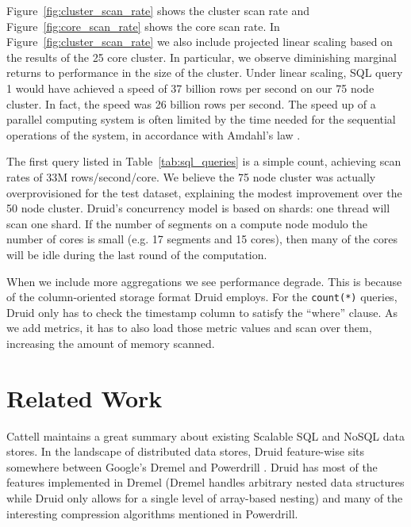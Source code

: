 \documentclass{vldb}
\begin{document}

Figure~\ref{fig:cluster_scan_rate} shows the cluster scan rate and
Figure~\ref{fig:core_scan_rate} shows the core scan rate.  In
Figure~\ref{fig:cluster_scan_rate} we also include projected linear
scaling based on the results of the 25 core cluster.  In particular,
we observe diminishing marginal returns to performance in the size of
the cluster.  Under linear scaling, SQL query 1 would have achieved a
speed of 37 billion rows per second on our 75 node cluster.  In fact,
the speed was 26 billion rows per second.  The speed up of a parallel
computing system is often limited by the time needed for the
sequential operations of the system, in accordance with Amdahl's law
\cite{amdahl1967validity}.

The first query listed in Table~\ref{tab:sql_queries} is a simple
count, achieving scan rates of 33M rows/second/core. We believe
the 75 node cluster was actually overprovisioned for the test
dataset, explaining the modest improvement over the 50 node cluster.
Druid's concurrency model is based on shards: one thread will scan one
shard. If the number of segments on a compute node modulo the number
of cores is small (e.g. 17 segments and 15 cores), then many of the
cores will be idle during the last round of the computation.

When we include more aggregations we see performance degrade.  This is
because of the column-oriented storage format Druid employs.  For the
\texttt{count(*)} queries, Druid only has to check the timestamp column to satisfy
the ``where'' clause.  As we add metrics, it has to also load those metric
values and scan over them, increasing the amount of memory scanned.

\section{Related Work}
\label{sec:related}
Cattell \cite{cattell2011scalable} maintains a great summary about existing Scalable SQL and
NoSQL data stores. In the landscape of distributed data stores, Druid
feature-wise sits somewhere between Google’s Dremel \cite{melnik2010dremel} and Powerdrill
\cite{hall2012processing}. Druid has most of the features implemented in Dremel (Dremel
handles arbitrary nested data structures while Druid only allows for a
single level of array-based nesting) and many of the interesting
compression algorithms mentioned in Powerdrill.
\end{document}
